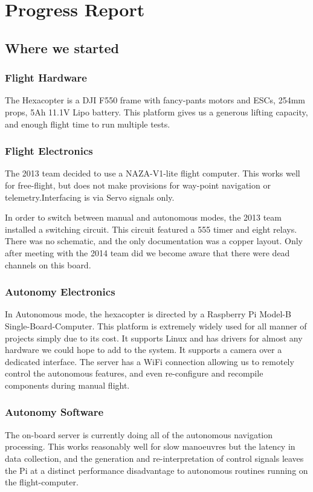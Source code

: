 \documentclass[a4paper, 11pt, titlepage]{article}
\begin{document}
  \section{Progress Report}
  \subsection{Where we started}
    \subsubsection{Flight Hardware}
      The Hexacopter is a DJI F550 frame with fancy-pants motors and ESCs, 254mm props, 5Ah 11.1V Lipo battery.
      This platform gives us a generous lifting capacity, and enough flight time to run multiple tests.

    \subsubsection{Flight Electronics}
      The 2013 team  decided to use a NAZA-V1-lite flight computer.  This works well for free-flight, but does not make provisions for way-point navigation or telemetry.Interfacing is via Servo signals only.

      In order to switch between manual and autonomous modes, the 2013 team installed a switching circuit. This circuit featured a 555 timer and eight relays.
      There was no schematic, and the only documentation was a copper layout. Only after meeting with the 2014 team did we become aware that there were dead channels on this board.

    \subsubsection{Autonomy Electronics}
      In Autonomous mode, the hexacopter is directed by a Raspberry Pi Model-B Single-Board-Computer.
      This platform is extremely widely used for all manner of projects simply due to its cost.
      It supports Linux and has drivers for almost any hardware we could hope to add to the system. It supports a camera over a dedicated interface.
      The server has a WiFi connection allowing us to remotely control the autonomous features, and even re-configure and recompile components during manual flight.

    \subsubsection{Autonomy Software}
      The on-board server is currently doing all of the autonomous navigation processing.  This works reasonably well for slow manoeuvres but the latency in data collection, and the generation and re-interpretation of control signals leaves the Pi at a distinct performance disadvantage to autonomous routines running on the flight-computer.
\end{document}
